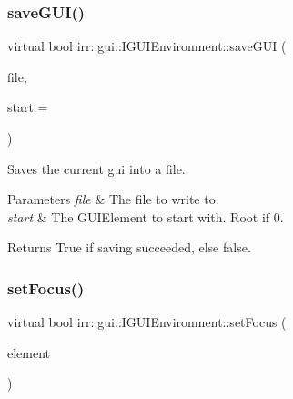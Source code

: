\subsubsection{\texorpdfstring{save\+G\+U\+I()}{saveGUI()}\hspace{0.1cm}{\footnotesize\ttfamily [2/2]}}
{\footnotesize\ttfamily virtual bool irr\+::gui\+::\+I\+G\+U\+I\+Environment\+::save\+G\+UI (\begin{DoxyParamCaption}\item[{\hyperlink{classirr_1_1io_1_1IWriteFile}{io\+::\+I\+Write\+File} $\ast$}]{file,  }\item[{\hyperlink{classirr_1_1gui_1_1IGUIElement}{I\+G\+U\+I\+Element} $\ast$}]{start = {} }\end{DoxyParamCaption})\hspace{0.3cm}{\ttfamily [pure virtual]}}



Saves the current gui into a file. 


\begin{DoxyParams}{Parameters}
{\em file} & The file to write to. \\
\hline
{\em start} & The G\+U\+I\+Element to start with. Root if 0. \\
\hline
\end{DoxyParams}
\begin{DoxyReturn}{Returns}
True if saving succeeded, else false. 
\end{DoxyReturn}
\mbox{\label{classirr_1_1gui_1_1IGUIEnvironment_a2bfe9985ae1a2f379e708fce86902cea}} 
\subsubsection{\texorpdfstring{set\+Focus()}{setFocus()}}
{\footnotesize\ttfamily virtual bool irr\+::gui\+::\+I\+G\+U\+I\+Environment\+::set\+Focus (\begin{DoxyParamCaption}\item[{\hyperlink{classirr_1_1gui_1_1IGUIElement}{I\+G\+U\+I\+Element} $\ast$}]{element }\end{DoxyParamCaption})\hspace{0.3cm}{\ttfamily [pure virtual]}}



